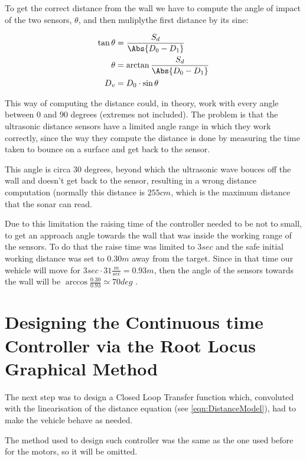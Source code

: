     To get the correct distance from the wall we have to compute the angle
    of impact of the two sensors, $\theta$, and then muliplythe first
    distance by its sine:

    \begin{align}
      \tan{\theta} &= \frac{S_d}{\Abs{D_0 - D_1}} \\
      \theta &= \arctan{\frac{S_d}{\Abs{D_0 - D_1}}} \\
      D_v &= D_0 \cdot \sin{\theta}
    \end{align}

    This way of computing the distance could, in theory, work with every
    angle between $0$ and $90$ degrees (extremes not included). The problem
    is that the \nxt{} ultrasonic distance sensors have a limited angle
    range in which they work correctly, since the way they compute the
    distance is done by measuring the time taken to bounce on a surface and
    get back to the sensor.

    This angle is circa $30$ degrees, beyond which the ultrasonic wave
    bouces off the wall and doesn't get back to the sensor, resulting in a
    wrong distance computation (normally this distance is $255 cm$, which
    is the maximum distance that the sonar can read.

    Due to this limitation the raising time of the controller needed to be
    not to small, to get an approach angle towards the wall that was inside
    the working range of the sensors. To do that the raise time was limited
    to $3 sec$ and the safe initial working distance was set to $0.30 m$
    away from the target. Since in that time our wehicle will move for $3 sec \cdot
    31 \frac{m}{sec} = 0.93 m$, then the angle of the sensors towards the
    wall will be $\arccos{\frac{0.30}{0.93}} \simeq 70 deg$
    \label{eqn:MathDist}.


\section{Designing the Continuous time Controller via the Root Locus
    Graphical Method}

  The next step was to design a Closed Loop Transfer function which,
  convoluted with the linearisation of the distance equation (see
  \ref{eqn:DistanceModel}), had to make the vehicle behave as needed.

  The method used to design such controller was the same as the one used
  before for the motors, so it will be omitted.

